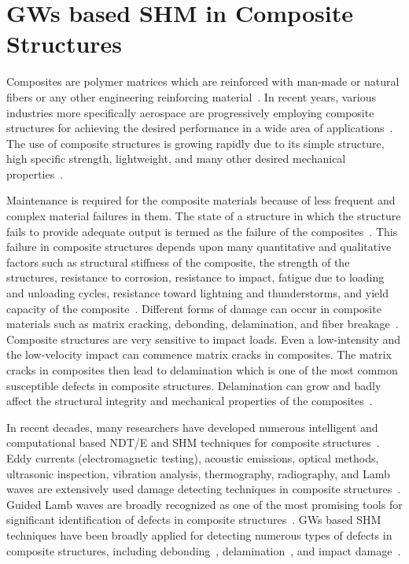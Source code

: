 \documentclass[b5paper, 11pt, titlepage]{book}
\begin{document}
\section{GWs based SHM in Composite Structures}
Composites are polymer matrices which are reinforced with man-made or natural fibers or any other engineering reinforcing material~\cite{jawaid2018structural, Rahul2018}. In recent years, various industries more specifically aerospace are progressively employing composite structures for achieving the desired performance in a wide area of applications~\cite{jawaid2018structural}. The use of composite structures is growing rapidly due to its simple structure, high specific strength, lightweight, and many other desired mechanical properties~\cite{jawaid2018structural, Radzienski2019}. 

Maintenance is required for the composite materials because of less frequent and complex material failures in them. The state of a structure in which the structure fails to provide adequate output is termed as the failure of the composites~\cite{Rahul2018}. This failure in composite structures depends upon many quantitative and qualitative factors such as structural stiffness of the composite, the strength of the structures, resistance to corrosion, resistance to impact, fatigue due to loading and unloading cycles, resistance toward lightning and thunderstorms, and yield capacity of the composite~\cite{Rahul2018}. Different forms of damage can occur in composite materials such as matrix cracking, debonding, delamination, and fiber breakage~\cite{stepinski2013advanced, Rahul2018, Yu2019,Fakih2019}. Composite structures are very sensitive to impact loads. Even a low-intensity and the low-velocity impact can commence matrix cracks in composites. The matrix cracks in composites then lead to delamination which is one of the most common susceptible defects in composite structures. Delamination can grow and badly affect the structural integrity and mechanical properties of the composites~\cite{Munian2018}. 

In recent decades, many researchers have developed numerous intelligent and computational based NDT/E and SHM techniques for composite structures~\cite{Gomes2018a}. Eddy currents (electromagnetic testing), acoustic emissions, optical methods, ultrasonic inspection, vibration analysis, thermography, radiography, and Lamb waves are extensively used damage detecting techniques in composite structures~\cite{Rahul2018, Gomes2018a}. Guided Lamb waves are broadly recognized as one of the most promising tools for significant identification of defects in composite structures~\cite{stepinski2013advanced, Kessler2002, Ricci2016}. GWs based SHM techniques have been broadly applied for detecting numerous types of defects in composite structures, including debonding~\cite{Sikdar2019}, delamination~\cite{Tian2015,Park2014}, and impact damage~\cite{Girolamo2018,Rogge2013,Kudela2018}. 
\end{document}
